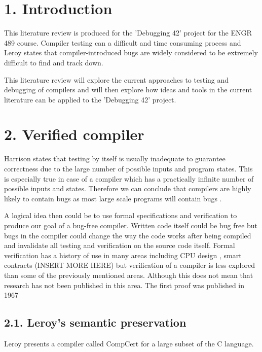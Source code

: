 \documentclass[11pt, a4paper, twoside, openright, twocolumn]{report}
\begin{document}
\begingroup
{} %

\section*{1. Introduction}
This literature review is produced for the 'Debugging 42' project for the ENGR 489 course. Compiler testing can a difficult and time consuming process
and Leroy \cite{Leroy:2009} states that compiler-introduced bugs are widely considered to be extremely difficult to find and track down.

This literature review will explore the current approaches to testing and debugging of compilers and will then explore how ideas and tools in the current literature can
be applied to the 'Debugging 42' project.

\section*{2. Verified compiler}
Harrison \cite{Harrison:2003} states that testing by itself is usually inadequate to guarantee correctness due to the large number of possible inputs and program states.
This is especially true in case of a compiler which has a practically infinite number of possible inputs and states. Therefore we can conclude that compilers are highly likely to contain bugs
as most large scale programs will contain bugs \cite{Harrison:2003}.

A logical idea then could be to use formal specifications and verification to produce our goal of a bug-free compiler. Written code itself could be bug free but
bugs in the compiler could change the way the code works after being compiled and invalidate all testing and verification on the source code itself.
Formal verification has a history of use in many areas including CPU design \cite{Harrison:2003} \cite{OLeary2004}, 
smart contracts \cite{8328737} (INSERT MORE HERE) but verification of a compiler is less explored than some of the previously mentioned areas.
Although this does not mean that research has not been published in this area. 
The first proof was published in 1967 \cite{McCarthy1967} 


\subsection*{2.1. Leroy's semantic preservation}
Leroy \cite{Leroy:2009} presents a compiler called CompCert for a large subset \cite{Blazy:2006} of the C language. 
\end{document}
